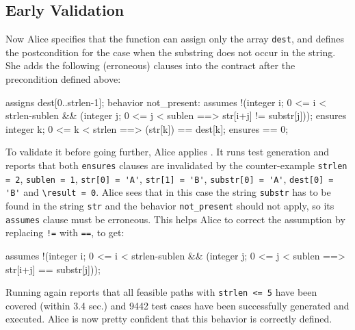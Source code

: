 \subsection{Early Validation}
\label{subsec:early_validation}


Now Alice specifies that the function can assign only the array
\lstinline{dest}, and defines the postcondition for the case when the
substring does not occur in the string. She adds the following (erroneous)
clauses into the contract after the precondition defined above:
\begin{pretty-codeACSL}
assigns dest[0..strlen-1];
behavior not_present:
 assumes !(\exists integer i; 0 <= i < strlen-sublen && 
  (\forall integer j; 0 <= j < sublen ==> str[i+j] != substr[j]));
 ensures \forall integer k; 0 <= k < strlen ==> \old(str[k]) == dest[k];
 ensures \result == 0;
\end{pretty-codeACSL}
To validate it before going further, Alice applies \stady.
It runs test generation and reports that
both \lstinline{ensures} clauses are invalidated by the counter-example
\lstinline{strlen = 2}, \lstinline{sublen = 1}, \lstinline{str[0] = 'A'},
\lstinline{str[1] = 'B'}, \lstinline{substr[0] = 'A'}, 
\lstinline{dest[0] = 'B'} and \lstinline{\result = 0}.
Alice sees that in
this case the string \lstinline{substr} has to be found in the
string \lstinline{str} and the behavior \lstinline{not_present} should not
apply, so its \lstinline{assumes} clause must be erroneous.
This helps Alice to correct the assumption by replacing \lstinline{!=} with
\lstinline{==}, to get:
\begin{pretty-codeACSL}
  assumes !(\exists integer i; 0 <= i < strlen-sublen && 
   (\forall integer j; 0 <= j < sublen ==> str[i+j] == substr[j]));
\end{pretty-codeACSL}
Running \stady again reports that all feasible paths with
\lstinline{strlen <= 5} have been covered (within 3.4 sec.) and 9442 test cases
have been
successfully generated and executed. Alice is now pretty confident that this
behavior is correctly defined.

